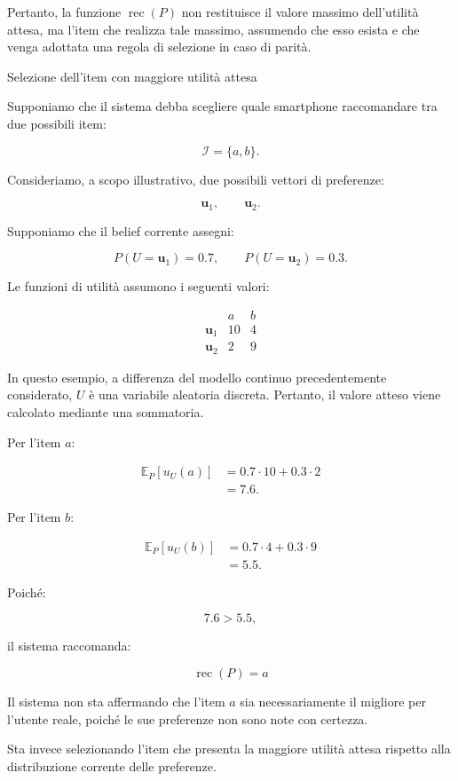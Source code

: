 Pertanto, la funzione $\operatorname{rec}(P)$ non restituisce
il valore massimo dell'utilità attesa, ma l'item che realizza
tale massimo, assumendo che esso esista e che venga adottata
una regola di selezione in caso di parità.

\begin{example}{Selezione dell'item con maggiore utilità attesa}

Supponiamo che il sistema debba scegliere quale smartphone
raccomandare tra due possibili item:

\[
\mathcal I=\{a,b\}.
\]

Consideriamo, a scopo illustrativo, due possibili vettori
di preferenze:

\[
\mathbf u_1,\qquad \mathbf u_2.
\]

Supponiamo che il belief corrente assegni:

\[
P(U=\mathbf u_1)=0.7,
\qquad
P(U=\mathbf u_2)=0.3.
\]

Le funzioni di utilità assumono i seguenti valori:

\[
\begin{array}{c|cc}
 & a & b\\
\hline
\mathbf u_1 & 10 & 4\\
\mathbf u_2 & 2 & 9
\end{array}
\]

In questo esempio, a differenza del modello continuo
precedentemente considerato, $U$ è una variabile aleatoria
discreta. Pertanto, il valore atteso viene calcolato mediante
una sommatoria.

Per l'item $a$:

\begin{align*}
\mathbb E_P[u_U(a)]
&=0.7\cdot 10+0.3\cdot 2\\
&=7.6.
\end{align*}

Per l'item $b$:

\begin{align*}
\mathbb E_P[u_U(b)]
&=0.7\cdot 4+0.3\cdot 9\\
&=5.5.
\end{align*}

Poiché:

\[
7.6>5.5,
\]

il sistema raccomanda:

\[
\boxed{
\operatorname{rec}(P)=a
}
\]

Il sistema non sta affermando che l'item $a$ sia necessariamente
il migliore per l'utente reale, poiché le sue preferenze
non sono note con certezza.

Sta invece selezionando l'item che presenta la maggiore
utilità attesa rispetto alla distribuzione corrente
delle preferenze.

\end{example}

